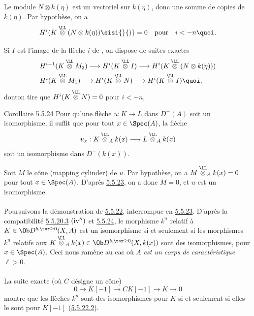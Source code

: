 \documentclass[10pt]{../fichiers-configuration-latex/smfart}
\begin{document}
Le module $N\otimes k(\eta)$ est un vectoriel sur $k(\eta)$, donc une
somme de copies de $k(\eta)$. Par hypothèse, on a
$$
H^{i}(K\overset{\LL}{\otimes} (N\otimes
k(\eta))\sisi{}{)}=0\quad\mbox{\rm pour}\quad i<-n{\quoi}.
$$

Si $I$ est l'image de la flèche $i$ de , on dispose de
suites exactes
\begin{align*}
& H^{i-1}(K\overset{\LL}{\otimes}M_{2})\longrightarrow
H^{i}(K\overset{\LL}{\otimes}I)\longrightarrow
H^{i}(K\overset{\LL}{\otimes}(N\otimes k(\eta)))\\
& H^{i}(K\overset{\LL}{\otimes}M_{1})\longrightarrow
H^{i}(K\overset{\LL}{\otimes}N)\longrightarrow
H^{i}(K\overset{\LL}{\otimes}I){\quoi},
\end{align*}
dont\pageoriginale on tire que
$H^{i}(K\overset{\LL}{\otimes}N)=0$ pour $i<-n$,
\cqfd

\begin{enonce*}{Corollaire 5.5.24}
Pour qu'une flèche $u:K\rightarrow L$ dans $D^{-}(A)$ soit un
isomorphisme, il suffit que pour tout $x\in \Spec(A)$, la flèche
$$
u_{x}:K\overset{\LL}{\otimes}_{A}k(x)\longrightarrow
L\overset{\LL}{\otimes}_{A}k(x)
$$
soit un isomorphisme dans $D^{-}(k(x))$.
\end{enonce*}

\sisi{\noindent}{}Soit $M$ le cône (mapping cylinder) de $u$. Par hypothèse, on a
$M\overset{\LL}{\otimes}_{A}k(x)=0$ pour tout
$x\in\Spec(A)$. D'après \hyperref[XVII.prop5.5.23]{5.5.23}, on a donc $M=0$, et $u$ est un
isomorphisme.

\setcounter{subsubsection}{25}
\setcounter{paragraph}{0}
\paragraph{}
Poursuivons la démonstration de \hyperref[XVII.lem5.5.22]{5.5.22}, interrompue
en \hyperref[XVII.prop5.5.23]{5.5.23}. D'après
la compatibilité \hyperref[XVII.par5.5.20.3]{5.5.20.3} ${\rm(iv'')}$ et
\hyperref[XVII.cor5.5.24]{5.5.24}, le morphisme $k^{n}$
relatif à $K\in \Ob D^{b,\tor\geq 0}(X,A)$ est un isomorphisme si et
seulement si les morphismes $k^{n}$ relatifs aux
$K\overset{\LL}{\otimes}_{A}k(x)\in \Ob
D^{b,\tor\geq 0}(X,k(x))$ sont des isomorphismes, pour $x\in
\Spec(A)$. Ceci nous ramène au cas où $A$ \emph{est un corps de
caractéristique} $\ell > 0$.

\paragraph{}
La suite exacte (où $C$ désigne un cône)
$$
0\longrightarrow K[-1]\longrightarrow CK[-1]\longrightarrow
K\longrightarrow 0
$$
montre que les flèches $k^{n}$ sont des isomorphismes pour $K$ si et
seulement si elles le sont pour $K[-1]$ (\hyperref[XVII.lem5.5.22.2]{5.5.22.2}).
\end{document}
